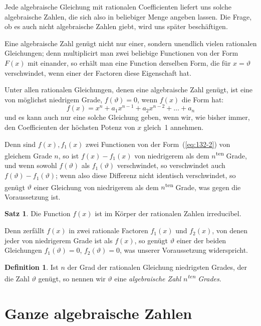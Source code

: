 \documentclass[12pt,a4paper]{article}
\theoremstyle{definition}
\newtheorem*{satz}{Satz}
\newtheorem*{definition}{Definition}
\begin{document}
Jede algebraische Gleichung mit rationalen Coefficienten liefert uns solche algebraische Zahlen, die sich also in beliebiger Menge angeben lassen. Die Frage, ob es auch nicht algebraische Zahlen giebt, wird uns später beschäftigen.

Eine algebraische Zahl genügt nicht nur einer, sondern unendlich vielen rationalen Gleichungen; denn multiplicirt man zwei beliebige Functionen von der Form $F(x)$ mit einander, so erhält man eine Function derselben Form, die für $x=\vartheta$ verschwindet, wenn einer der Factoren diese Eigenschaft hat.

Unter allen rationalen Gleichungen, denen eine algebraische Zahl genügt, ist eine von möglichst niedrigem Grade, $f(\vartheta)=0$, wenn $f(x)$ die Form hat:
\begin{equation}\label{eq:132-2}
f(x) = x^n + a_1 x^{n-1} + a_2 x^{n-2} + \dots + a_n
\end{equation}
und es kann auch nur eine solche Gleichung geben, wenn wir, wie bisher immer, den Coefficienten der höchsten Potenz von $x$ gleich~1 annehmen.

Denn sind $f(x),f_1(x)$ zwei Functionen von der Form~(\ref{eq:132-2}) von gleichem Grade $n$, so ist $f(x)-f_1(x)$ von niedrigerem als dem $n$\textsuperscript{ten} Grade, und wenn sowohl $f(\vartheta)$ als $f_1(\vartheta)$ verschwindet, so verschwindet auch $f(\vartheta)-f_1(\vartheta)$; wenn also diese Differenz nicht identisch verschwindet, so genügt $\vartheta$ einer Gleichung von niedrigerem als dem $n$\textsuperscript{ten} Grade, was gegen die Voraussetzung ist.

\begin{satz}
Die Function $f(x)$ ist im Körper der rationalen Zahlen irreducibel.
\end{satz}

Denn zerfällt $f(x)$ in zwei rationale Factoren $f_1(x)$ und $f_2(x)$, von denen jeder von niedrigerem Grade ist als $f(x)$, so genügt $\vartheta$ einer der beiden Gleichungen $f_1(\vartheta)=0$, $f_2(\vartheta)=0$, was unserer Voraussetzung widerspricht.

\begin{definition}
Ist $n$ der Grad der rationalen Gleichung niedrigsten Grades, der die Zahl $\vartheta$ genügt, so nennen wir $\vartheta$ eine \emph{algebraische Zahl $n$\textsuperscript{ten} Grades}.
\end{definition}

\newpage
\section{Ganze algebraische Zahlen}\label{sec:133}
\end{document}
